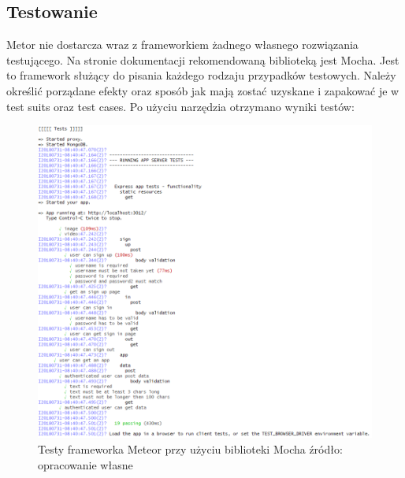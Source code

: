 \documentclass[12pt]{report}
\begin{document}
    \subsection{Testowanie}
      Metor nie dostarcza wraz z frameworkiem żadnego własnego rozwiązania testującego.
      Na stronie dokumentacji rekomendowaną biblioteką jest Mocha.
      Jest to framework służący do pisania każdego rodzaju przypadków testowych.
      Należy określić porządane efekty oraz sposób jak mają zostać uzyskane i zapakować je w test suits oraz test cases.
      Po użyciu narzędzia otrzymano wyniki testów:
      \begin{figure}[!hb]
        \centering
        \includegraphics[width=\textwidth,height=\textheight,keepaspectratio]{test_meteor.png} 
        \caption{Testy frameworka Meteor przy użyciu biblioteki Mocha \newline źródło: opracowanie własne}
      \end{figure}
\end{document}
